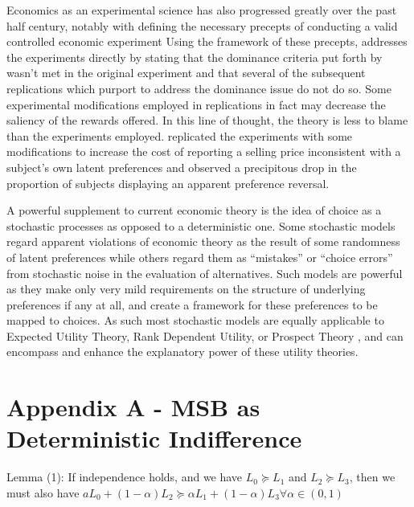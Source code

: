 \documentclass[../main.tex]{subfiles}
\begin{document}
Economics as an experimental science has also progressed greatly over the past half century, notably with \textcite{Smith1982} defining the necessary precepts of conducting a valid controlled economic experiment
Using the framework of these precepts, \textcite{Harrison1994} addresses the \textcite{Grether1979} experiments directly by stating that the dominance criteria put forth by \textcite{Smith1982} wasn't met in the original experiment and that several of the subsequent replications which purport to address the dominance issue do not do so.
Some experimental modifications employed in replications in fact may decrease the saliency of the rewards offered.
In this line of thought, the theory is less to blame than the experiments employed.
\textcite[236-239]{Harrison1994} replicated the\textcite{Grether1979} experiments with some modifications to increase the cost of reporting a selling price inconsistent with a subject's own latent preferences and observed a precipitous drop in the proportion of subjects displaying an apparent preference reversal.

A powerful supplement to current economic theory is the idea of choice as a stochastic processes as opposed to a deterministic one.
Some stochastic models regard apparent violations of economic theory as the result of some randomness of latent preferences while others regard them as \enquote{mistakes} or \enquote{choice errors} from stochastic noise in the evaluation of alternatives.
Such models are powerful as they make only very mild requirements on the structure of underlying preferences if any at all, and create a framework for these preferences to be mapped to choices.
As such most stochastic models are equally applicable to Expected Utility Theory, Rank Dependent Utility, or Prospect Theory \parencite{Kahneman1979, Tversky1992}, and can encompass and enhance the explanatory power of these utility theories.

\break

\section{Appendix A - MSB as Deterministic Indifference}

Lemma (1): If independence holds, and we have $L_0 \succeq L_1$ and $L_2 \succeq L_3$, then we must also have $aL_0 + (1-\alpha)L_2 \succeq \alpha L_1 + (1 - \alpha) L_3 \forall \alpha \in (0,1)$
\end{document}
